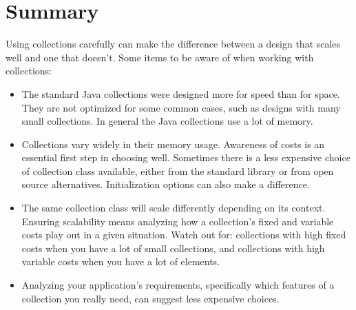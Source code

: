 \section{Summary}
Using collections carefully can
make the difference between a design that scales well and one that
doesn't. Some items to be aware of when working with collections:
\begin{itemize}
  \item The standard Java collections were designed more for speed than for
  space. They are not optimized for some common cases, such as designs with many small
  collections. In general the Java collections use a lot of memory.
  \item Collections vary widely in their memory usage. Awareness of
  costs is an essential first step in choosing well. Sometimes there is a less
  expensive choice of collection class available, either from the standard
  library or from open source alternatives. Initialization options can also make
  a difference.
  \item The same collection class will scale differently depending on its
  context. Ensuring scalability means
  analyzing how a collection's fixed and variable costs
  play out in a given situation. Watch out for: collections with
  high fixed costs when you have a lot of small collections, and 
  collections with high variable costs when you have a
  lot of elements.
  \item Analyzing your application's requirements, specifically
  which features of a collection you really need, can suggest
  less expensive choices.
\end{itemize}
